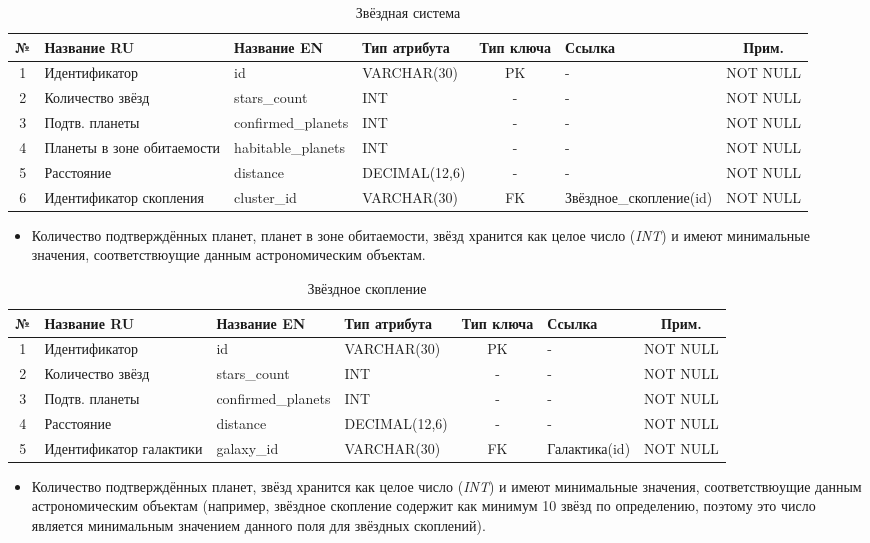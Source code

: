 \documentclass[14pt,a4paper]{extarticle}
\begin{document}
	\begin{table}[H]
		\centering
		\caption{Звёздная система}
		\small
\begin{tabular}{|c|p{3.2cm}|p{2.6cm}|p{2.8cm}|c|p{2.5cm}|c|}
\hline
№ & Название RU & Название EN & Тип атрибута & Тип ключа & Ссылка & Прим. \\
\hline
1 & Идентификатор & id & VARCHAR(30) & PK & - & NOT NULL \\
2 & Количество звёзд & stars_count & INT & - & - & NOT NULL \\
3 & Подтв. планеты & confirmed_planets & INT & - & - & NOT NULL \\
4 & Планеты в зоне обитаемости & habitable_planets & INT & - & - & NOT NULL \\
5 & Расстояние & distance & DECIMAL(12,6) & - & - & NOT NULL \\
6 & Идентификатор скопления & cluster_id & VARCHAR(30) & FK & Звёздное_скопление(id) & NOT NULL \\
\hline
\end{tabular}
	\end{table}

	\begin{itemize}
		\item Количество подтверждённых планет, планет в зоне обитаемости, звёзд хранится как целое число (\textit{INT}) и имеют минимальные значения, соответствюущие данным астрономическим объектам.
	\end{itemize}

	\begin{table}[H]
		\centering
		\caption{Звёздное скопление}
		\small
\begin{tabular}{|c|p{3.2cm}|p{2.6cm}|p{2.8cm}|c|p{2.5cm}|c|}
\hline
№ & Название RU & Название EN & Тип атрибута & Тип ключа & Ссылка & Прим. \\
\hline
1 & Идентификатор & id & VARCHAR(30) & PK & - & NOT NULL \\
2 & Количество звёзд & stars_count & INT & - & - & NOT NULL \\
3 & Подтв. планеты & confirmed_planets & INT & - & - & NOT NULL \\
4 & Расстояние & distance & DECIMAL(12,6) & - & - & NOT NULL \\
5 & Идентификатор галактики & galaxy_id & VARCHAR(30) & FK & Галактика(id) & NOT NULL \\
\hline
\end{tabular}
	\end{table}

	\begin{itemize}
		\item Количество подтверждённых планет, звёзд хранится как целое число (\textit{INT}) и имеют минимальные значения, соответствюущие данным астрономическим объектам (например, звёздное скопление содержит как минимум 10 звёзд по определению, поэтому это число является минимальным значением данного поля для звёздных скоплений).
	\end{itemize}
\end{document}
